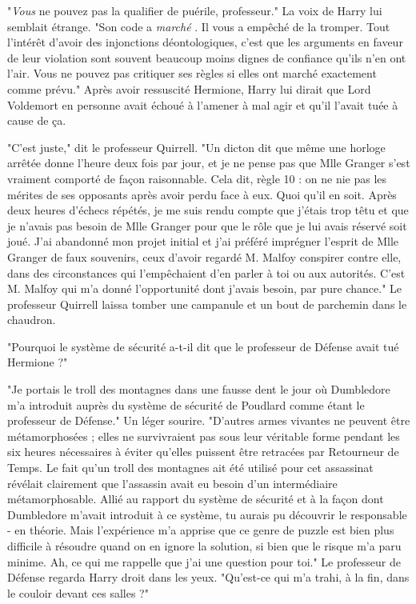 "\emph{Vous}  ne pouvez pas la qualifier de puérile, professeur." La voix de Harry lui semblait étrange. "Son code a \emph{marché} . Il vous a empêché de la tromper. Tout l'intérêt d'avoir des injonctions déontologiques, c'est que les arguments en faveur de leur violation sont souvent beaucoup moins dignes de confiance qu'ils n'en ont l'air. Vous ne pouvez pas critiquer ses règles si elles ont marché exactement comme prévu." Après avoir ressuscité Hermione, Harry lui dirait que Lord Voldemort en personne avait échoué à l'amener à mal agir et qu'il l'avait tuée à cause de ça.

"C'est juste," dit le professeur Quirrell. "Un dicton dit que même une horloge arrêtée donne l'heure deux fois par jour, et je ne pense pas que Mlle Granger s'est vraiment comporté de façon raisonnable. Cela dit, règle 10 : on ne nie pas les mérites de ses opposants après avoir perdu face à eux. Quoi qu'il en soit. Après deux heures d'échecs répétés, je me suis rendu compte que j'étais trop têtu et que je n'avais pas besoin de Mlle Granger pour que le rôle que je lui avais réservé soit joué. J'ai abandonné mon projet initial et j'ai préféré imprégner l'esprit de Mlle Granger de faux souvenirs, ceux d'avoir regardé M. Malfoy conspirer contre elle, dans des circonstances qui l'empêchaient d'en parler à toi ou aux autorités. C'est M. Malfoy qui m'a donné l'opportunité dont j'avais besoin, par pure chance." Le professeur Quirrell laissa tomber une campanule et un bout de parchemin dans le chaudron.

"Pourquoi le système de sécurité a-t-il dit que le professeur de Défense avait tué Hermione ?"

"Je portais le troll des montagnes dans une fausse dent le jour où Dumbledore m'a introduit auprès du système de sécurité de Poudlard comme étant le professeur de Défense." Un léger sourire. "D'autres armes vivantes ne peuvent être métamorphosées ; elles ne survivraient pas sous leur véritable forme pendant les six heures nécessaires à éviter qu'elles puissent être retracées par Retourneur de Temps. Le fait qu'un troll des montagnes ait été utilisé pour cet assassinat révélait clairement que l'assassin avait eu besoin d'un intermédiaire métamorphosable. Allié au rapport du système de sécurité et à la façon dont Dumbledore m'avait introduit à ce système, tu aurais pu découvrir le responsable - en théorie. Mais l'expérience m'a apprise que ce genre de puzzle est bien plus difficile à résoudre quand on en ignore la solution, si bien que le risque m'a paru minime. Ah, ce qui me rappelle que j'ai une question pour toi." Le professeur de Défense regarda Harry droit dans les yeux. "Qu'est-ce qui m'a trahi, à la fin, dans le couloir devant ces salles ?"


